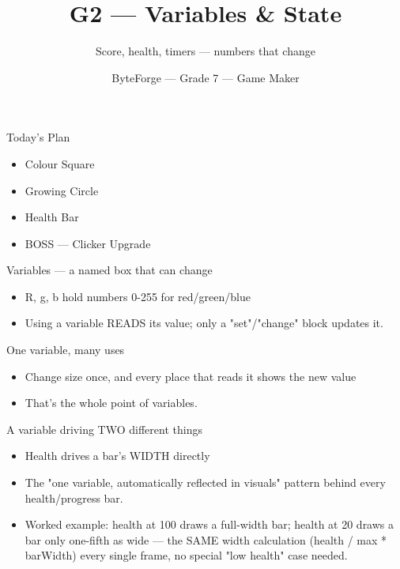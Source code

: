 \documentclass[aspectratio=169]{beamer}
\title{G2 — Variables \& State}
\subtitle{Score, health, timers — numbers that change}
\author{ByteForge --- Grade 7 --- Game Maker}
\date{}
\begin{document}
\begin{frame}
    \titlepage
\end{frame}

\begin{frame}{Today's Plan}
    \begin{itemize}
        \item Colour Square
        \item Growing Circle
        \item Health Bar
        \item[$\bigstar$] BOSS --- Clicker Upgrade
    \end{itemize}
\end{frame}

\begin{frame}{Variables — a named box that can change}
    \large
    \begin{itemize}
        \item R, g, b hold numbers 0-255 for red/green/blue
        \item Using a variable READS its value; only a "set"/"change" block updates it.
    \end{itemize}
\end{frame}


\begin{frame}{One variable, many uses}
    \large
    \begin{itemize}
        \item Change size once, and every place that reads it shows the new value
        \item That's the whole point of variables.
    \end{itemize}
\end{frame}


\begin{frame}{A variable driving TWO different things}
    \large
    \begin{itemize}
        \item Health drives a bar's WIDTH directly
        \item The "one variable, automatically reflected in visuals" pattern behind every health/progress bar.
        \item Worked example: health at 100 draws a full-width bar; health at 20 draws a bar only one-fifth as wide — the SAME width calculation (health / max * barWidth) every single frame, no special "low health" case needed.
    \end{itemize}

    \begin{center}
    \end{center}
\end{frame}
\end{document}

